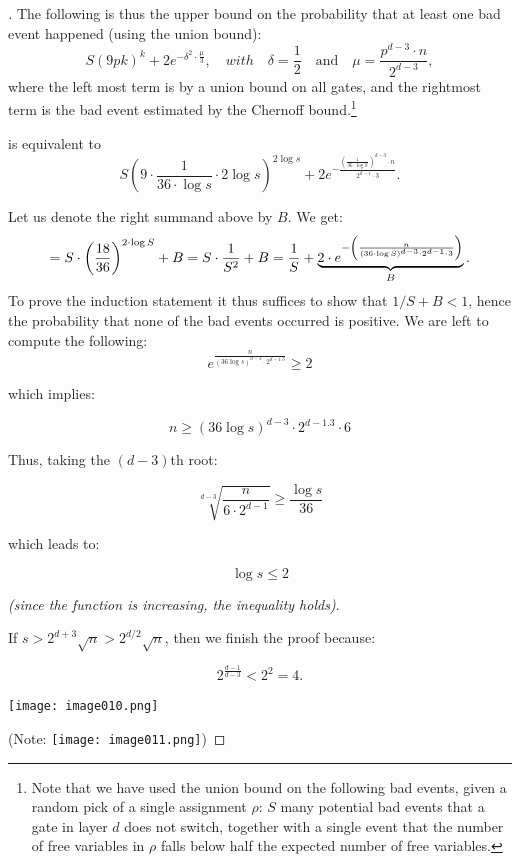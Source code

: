 \begin{proof}[]
The following is thus the upper bound on the probability that at least one bad event happened (using the union bound): 
\begin{equation}\label{eq:487:28}
 S(9pk)^k + 2e^{-\delta^2 \cdot \frac{\mu}{3}}, \quad with \quad \delta = \frac{1}{2} \quad \text{and} \quad \mu = \frac{p^{d-3} \cdot n}{2^{d-3}},
\end{equation}
where the left most term is by a union bound on all gates, and the rightmost term is the bad event estimated by the  Chernoff bound.\footnote{%
Note that we have used the union bound on the following bad events, given a random pick of a single assignment $\rho$: $S$ many potential bad events that a gate in layer $d$ does not switch, together with a single event that the number of free variables in $\rho$ falls below half the expected number of free variables.
}



 is equivalent to 
\[
S \left( 9 \cdot \frac{1}{36 \cdot \log s} \cdot 2 \log s \right)^{2 \log s} + 
2 e^{-\frac{\left(\frac{1}{36 \cdot \log S }\right)^{d-3} \cdot n}{2^{d-1} \cdot 3}}.
\]


Let us denote the right summand above by $B$. 
We get:
$$
=S \cdot\left(\frac{18}{36}\right)^{2 \cdot \log S}+B =S \cdot \frac{1}{S^2}+B =
\frac{1}{S}+
\underbrace{
2\cdot
e^{-\left(\frac{n}{{(36 \cdot \log S)^{d-3} \cdot 2^{d-1} \cdot 3}}\right)}
}_B.
$$
To prove the induction statement it thus suffices to show that $1/S+B<1$, hence the probability that none of the bad events occurred is positive. We are left to compute the following:
\[
e^{\frac{n}{(36 \log s)^{d-3} \cdot 2^{d-1.3}}} \geq 2
\]

which implies:

\[
n \geq (36 \log s)^{d-3} \cdot 2^{d-1.3} \cdot 6
\]

Thus, taking the $(d-3)$th root:

\[
\sqrt[d-3]{\frac{n}{6 \cdot 2^{d-1}}} \geq \frac{\log s}{36}
\]

which leads to:

\[
\log s \leq 2
\]

\textit{(since the function is increasing, the inequality holds)}.

If \( s > 2^{d+3} \sqrt{n} > 2^{d/2} \sqrt{n} \), then we finish the proof because:

\[
2^{\frac{d-1}{d-3}} < 2^2 = 4.
\]



\texttt{[image: image010.png]}

(Note: \texttt{[image: image011.png]})
\mbox{}
\end{proof} %


